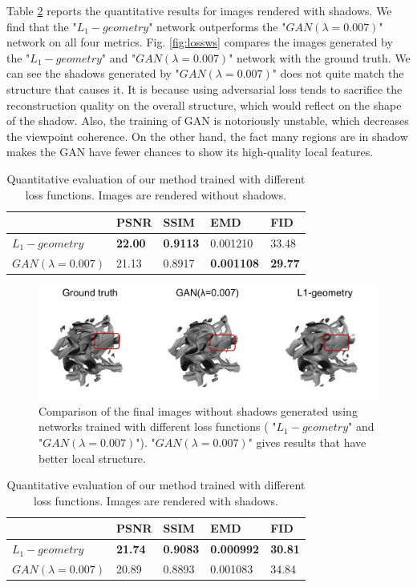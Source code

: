 \documentclass[journal]{vgtc}                %
\begin{document}
Table \ref{table:lossws} reports the quantitative results for images rendered with shadows. We find that the "$L_1-geometry$" network outperforms the "$GAN(\lambda=0.007)$" network on all four metrics. Fig. \ref{fig:lossws} compares the images generated by the "$L_1-geometry$" and "$GAN(\lambda=0.007)$" network with the ground truth. We can see the shadows generated by "$GAN(\lambda=0.007)$" does not quite match the structure that causes it. It is because using adversarial loss tends to sacrifice the reconstruction quality on the overall structure, which would reflect on the shape of the shadow. Also, the training of GAN is notoriously unstable, which decreases the viewpoint coherence. On the other hand, the fact many regions are in shadow makes the GAN have fewer chances to show its high-quality local features.       

\begin{table}
\caption{Quantitative evaluation of our method trained with different loss functions. Images are rendered without shadows. }
    \centering
    \begin{tabular}{l|l|l|l|l}
         & PSNR & SSIM & EMD & FID \\  \hline
         $L_1-geometry$ & \textbf{22.00} & \textbf{0.9113} & 0.001210 & 33.48
   \\ \hline
         $GAN(\lambda=0.007)$ & 21.13 & 0.8917 & \textbf{0.001108} & \textbf{29.77}  \\ 
    \end{tabular}
    \label{table:losswos}
\end{table}

\begin{figure}
  \centering
  \includegraphics[width=1\linewidth]{losswos}
  \caption{Comparison of the final images without shadows generated using networks trained with different loss functions (  "$L_1-geometry$" and "$GAN(\lambda=0.007)$"). "$GAN(\lambda=0.007)$" gives results that have better local structure. }
  \label{fig:losswos}
\end{figure}

\begin{table}
\caption{Quantitative evaluation of our method trained with different loss functions. Images are rendered with shadows.}
    \centering
    \begin{tabular}{l|l|l|l|l}
         & PSNR & SSIM & EMD & FID \\  \hline
         $L_1-geometry$ & \textbf{21.74} & \textbf{0.9083} & \textbf{0.000992} & \textbf{30.81}
   \\ \hline
         $GAN(\lambda=0.007)$ & 20.89 & 0.8893 & 0.001083 & 34.84  \\ 
    \end{tabular}
    \label{table:lossws}
\end{table}
\end{document}
